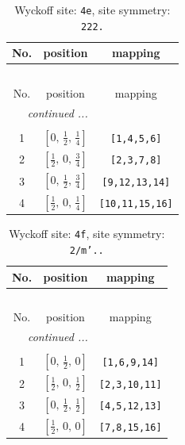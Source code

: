 \documentclass[fleqn,8pt]{jsarticle}
\begin{document}
\begin{longtable}{ccc}
\caption{Wyckoff site: {\tt 4e}, site symmetry: {\tt 222.}}
 \\
 \hline \hline
No. & position & mapping \\ \hline \endfirsthead

\multicolumn{2}{l}{\tablename\ \thetable{}} \\
 \hline \hline
No. & position & mapping \\ \hline \endhead

 \hline \hline
\multicolumn{2}{r}{\footnotesize\it continued ...} \\ \endfoot

 \hline \hline
\multicolumn{2}{r}{} \\ \endlastfoot

1 & $\left[ 0,\, \frac{1}{2},\, \frac{1}{4} \right]$ & {\tt [1,4,5,6]} \\ \hline
2 & $\left[ \frac{1}{2},\, 0,\, \frac{3}{4} \right]$ & {\tt [2,3,7,8]} \\ \hline
3 & $\left[ 0,\, \frac{1}{2},\, \frac{3}{4} \right]$ & {\tt [9,12,13,14]} \\ \hline
4 & $\left[ \frac{1}{2},\, 0,\, \frac{1}{4} \right]$ & {\tt [10,11,15,16]} \\
\end{longtable}
\renewcommand{\arraystretch}{1.2}
\begin{longtable}{ccc}
\caption{Wyckoff site: {\tt 4f}, site symmetry: {\tt 2/m'..}}
 \\
 \hline \hline
No. & position & mapping \\ \hline \endfirsthead

\multicolumn{2}{l}{\tablename\ \thetable{}} \\
 \hline \hline
No. & position & mapping \\ \hline \endhead

 \hline \hline
\multicolumn{2}{r}{\footnotesize\it continued ...} \\ \endfoot

 \hline \hline
\multicolumn{2}{r}{} \\ \endlastfoot

1 & $\left[ 0,\, \frac{1}{2},\, 0 \right]$ & {\tt [1,6,9,14]} \\ \hline
2 & $\left[ \frac{1}{2},\, 0,\, \frac{1}{2} \right]$ & {\tt [2,3,10,11]} \\ \hline
3 & $\left[ 0,\, \frac{1}{2},\, \frac{1}{2} \right]$ & {\tt [4,5,12,13]} \\ \hline
4 & $\left[ \frac{1}{2},\, 0,\, 0 \right]$ & {\tt [7,8,15,16]} \\
\end{longtable}
\end{document}
